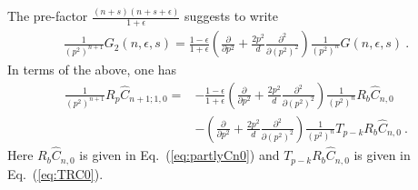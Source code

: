\documentclass[a4paper,11pt]{article}
\begin{document}
The pre-factor $\frac{(n+s)(n+s+\epsilon)}{1+\epsilon}$ suggests to write 
\begin{align}
\frac{1}{(p^2)^{n+1}}G_2(n,\epsilon,s)=\frac{1-\epsilon}{1+\epsilon}\left(\frac{\partial}{\partial p^2}+\frac{2p^2}{d}\frac{\partial^2}{\partial(p^2)^2}\right)\frac{1}{(p^2)^n}G(n,\epsilon,s) \ .
\end{align}
In terms of the above, one has 
\begin{align}\label{eq:partlyCn1}
\frac{1}{(p^2)^{n+1}}R_p \hat C_{n+1;1,0}=&-\frac{1-\epsilon}{1+\epsilon}\left(\frac{\partial}{\partial p^2}+\frac{2p^2}{d}\frac{\partial^2}{\partial(p^2)^2}\right)\frac{1}{(p^2)^n}R_b\hat C_{n,0}\nonumber \\ 
&-\left(\frac{\partial}{\partial p^2}+\frac{2p^2}{d}\frac{\partial^2}{\partial(p^2)^2}\right)\frac{1}{(p^2)^n}T_{p-k}R_b \hat C_{n,0} \ .
\end{align}
Here $R_b\hat C_{n,0}$ is given in Eq.~(\ref{eq:partlyCn0}) and $T_{p-k}R_b \hat C_{n,0}$ is given in Eq.~(\ref{eq:TRC0}). 
\end{document}
